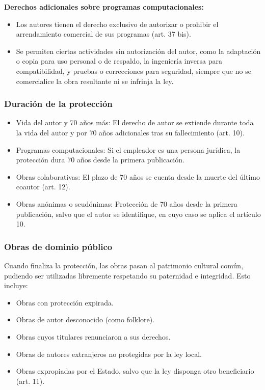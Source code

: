 \documentclass{templateNote}
\begin{document}
\textbf{Derechos adicionales sobre programas computacionales:}
\begin{itemize}
    \item Los autores tienen el derecho exclusivo de autorizar o prohibir el arrendamiento comercial de sus programas (art. 37 bis).
    \item Se permiten ciertas actividades sin autorización del autor, como la adaptación o copia para uso personal o de respaldo, la ingeniería inversa para compatibilidad, y pruebas o correcciones para seguridad, siempre que no se comercialice la obra resultante ni se infrinja la ley.
\end{itemize}

\subsubsection{Duración de la protección}
\begin{itemize}
    \item Vida del autor y 70 años más: El derecho de autor se extiende durante toda la vida del autor y por 70 años adicionales tras su fallecimiento (art. 10).
    \item Programas computacionales: Si el empleador es una persona jurídica, la protección dura 70 años desde la primera publicación.
    \item Obras colaborativas: El plazo de 70 años se cuenta desde la muerte del último coautor (art. 12).
    \item Obras anónimas o seudónimas: Protección de 70 años desde la primera publicación, salvo que el autor se identifique, en cuyo caso se aplica el artículo 10.
\end{itemize}

\subsubsection*{Obras de dominio público}
Cuando finaliza la protección, las obras pasan al patrimonio cultural común, pudiendo ser utilizadas libremente respetando su paternidad e integridad. Esto incluye:
\begin{itemize}
    \item Obras con protección expirada.
    \item Obras de autor desconocido (como folklore).
    \item Obras cuyos titulares renunciaron a sus derechos.
    \item Obras de autores extranjeros no protegidas por la ley local.
    \item Obras expropiadas por el Estado, salvo que la ley disponga otro beneficiario (art. 11).
\end{itemize}
\end{document}
